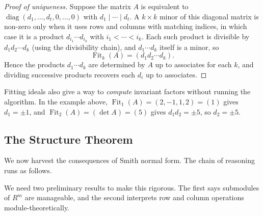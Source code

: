 \begin{proof}[Proof of uniqueness]
	Suppose the matrix $A$ is equivalent to $\operatorname{diag}(d_1, \dots, d_t, 0, \dots, 0)$ with $d_1 \mid \cdots \mid d_t$. A $k \times k$ minor of this diagonal matrix is non-zero only when it uses rows and columns with matching indices, in which case it is a product $d_{i_1}\cdots d_{i_k}$ with $i_1 < \cdots < i_k$. Each such product is divisible by $d_1 d_2 \cdots d_k$ (using the divisibility chain), and $d_1 \cdots d_k$ itself is a minor, so
	$$
	\operatorname{Fit}_k(A) = (d_1 d_2 \cdots d_k).
	$$
	Hence the products $d_1 \cdots d_k$ are determined by $A$ up to associates for each $k$, and dividing successive products recovers each $d_i$ up to associates.
\end{proof}

\begin{remark}
	Fitting ideals also give a way to \emph{compute} invariant factors without running the algorithm. In the example above, $\operatorname{Fit}_1(A) = (2, -1, 1, 2) = (1)$ gives $d_1 = \pm 1$, and $\operatorname{Fit}_2(A) = (\det A) = (5)$ gives $d_1 d_2 = \pm 5$, so $d_2 = \pm 5$.
\end{remark}

\subsection{The Structure Theorem}

We now harvest the consequences of Smith normal form. The chain of reasoning runs as follows.

\begin{center}
\end{center}

We need two preliminary results to make this rigorous. The first says submodules of $R^m$ are manageable, and the second interprets row and column operations module-theoretically.

